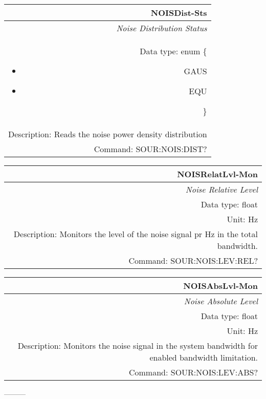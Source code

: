 \documentclass[openany]{article}
\begin{document}
		\begin{tabular}{N}
			\hline
			\bfseries NOISDist-Sts \\ \hline
			\emph{Noise Distribution Status} \\
			Data type: enum \{\begin{itemize}[noitemsep]
				\small
				\item[] GAUS
				\item[] EQU

			\end{itemize}\} \\ 
			Description: Reads the noise power density distribution \\
			Command: SOUR:NOIS:DIST? \\

		\end{tabular}
%
		\begin{tabular}{N}
			\hline
			\bfseries NOISRelatLvl-Mon \\ \hline
			\emph{Noise Relative Level} \\
			Data type: float \\
			Unit: Hz \\
			Description: Monitors the level of the noise signal pr Hz in the total bandwidth. \\
			Command: SOUR:NOIS:LEV:REL? \\

		\end{tabular}
%
		\begin{tabular}{N}
			\hline
			\bfseries NOISAbsLvl-Mon \\ \hline
			\emph{Noise Absolute Level} \\
			Data type: float \\
			Unit: Hz \\
			Description: Monitors the noise signal in the system bandwidth for enabled bandwidth limitation. \\
			Command: SOUR:NOIS:LEV:ABS? \\

		\end{tabular}
%


---------
\end{document}
